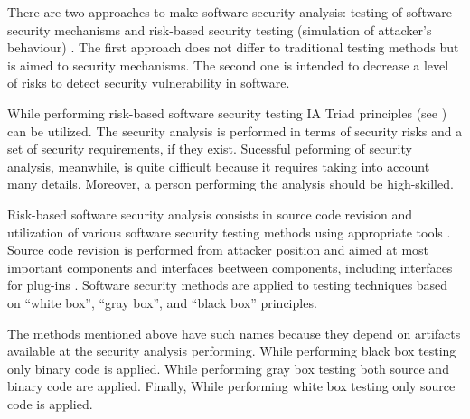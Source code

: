 %
There are two approaches to make software security analysis: testing of software security mechanisms and risk-based security testing (simulation of attacker's behaviour) . 
%
The first approach does not differ to traditional testing methods but is aimed to security mechanisms. 
%
The second one is intended to decrease a level of risks to detect security vulnerability in software. 

%
While performing risk-based software security testing IA Triad principles (see ) can be utilized. 
%
The security analysis is performed in terms of security risks and a set of security requirements, if they exist. 
%
Sucessful peforming of security analysis, meanwhile, is quite difficult because it requires taking into account many details. 
%
Moreover, a person performing the analysis should be high-skilled. 

%
Risk-based software security analysis consists in source code revision and utilization of various software security testing methods using appropriate tools . 
%
Source code revision is performed from \An attacker position and aimed at most important components and interfaces beetween components, including interfaces for plug-ins . 
%
Software security methods are applied to testing techniques based on ``white box'', ``gray box'', and ``black box'' principles. 

%
The methods mentioned above have such names because they depend on artifacts available at the security analysis performing. 
%
While performing black box testing only binary code is applied. 
%
While performing gray box testing both source and binary code are applied. 
%
Finally, While performing white box testing only source code is applied. 